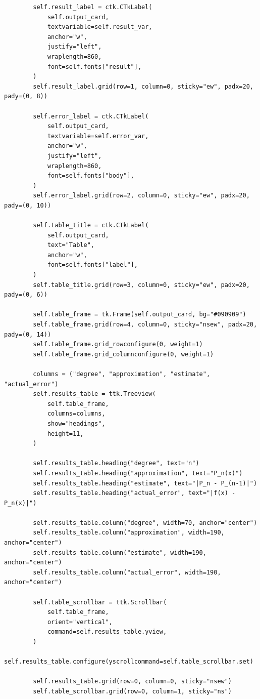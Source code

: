 \documentclass[12pt,a4paper]{article}
\begin{document}
\begin{verbatim}
        self.result_label = ctk.CTkLabel(
            self.output_card,
            textvariable=self.result_var,
            anchor="w",
            justify="left",
            wraplength=860,
            font=self.fonts["result"],
        )
        self.result_label.grid(row=1, column=0, sticky="ew", padx=20, pady=(0, 8))

        self.error_label = ctk.CTkLabel(
            self.output_card,
            textvariable=self.error_var,
            anchor="w",
            justify="left",
            wraplength=860,
            font=self.fonts["body"],
        )
        self.error_label.grid(row=2, column=0, sticky="ew", padx=20, pady=(0, 10))

        self.table_title = ctk.CTkLabel(
            self.output_card,
            text="Table",
            anchor="w",
            font=self.fonts["label"],
        )
        self.table_title.grid(row=3, column=0, sticky="ew", padx=20, pady=(0, 6))

        self.table_frame = tk.Frame(self.output_card, bg="#090909")
        self.table_frame.grid(row=4, column=0, sticky="nsew", padx=20, pady=(0, 14))
        self.table_frame.grid_rowconfigure(0, weight=1)
        self.table_frame.grid_columnconfigure(0, weight=1)

        columns = ("degree", "approximation", "estimate", "actual_error")
        self.results_table = ttk.Treeview(
            self.table_frame,
            columns=columns,
            show="headings",
            height=11,
        )

        self.results_table.heading("degree", text="n")
        self.results_table.heading("approximation", text="P_n(x)")
        self.results_table.heading("estimate", text="|P_n - P_(n-1)|")
        self.results_table.heading("actual_error", text="|f(x) - P_n(x)|")

        self.results_table.column("degree", width=70, anchor="center")
        self.results_table.column("approximation", width=190, anchor="center")
        self.results_table.column("estimate", width=190, anchor="center")
        self.results_table.column("actual_error", width=190, anchor="center")

        self.table_scrollbar = ttk.Scrollbar(
            self.table_frame,
            orient="vertical",
            command=self.results_table.yview,
        )
        self.results_table.configure(yscrollcommand=self.table_scrollbar.set)

        self.results_table.grid(row=0, column=0, sticky="nsew")
        self.table_scrollbar.grid(row=0, column=1, sticky="ns")


\end{verbatim}
\end{document}
